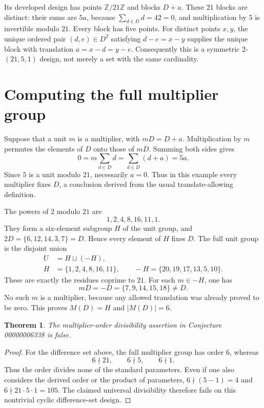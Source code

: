 \documentclass[11pt]{article}
\newtheorem{theorem}{Theorem}
\newcommand{\Z}{\mathbb Z}
\begin{document}
Its developed design has points $\Z/21\Z$ and blocks $D+a$.
These $21$ blocks are distinct: their sums are $5a$, because
$\sum_{d\in D}d=42=0$, and multiplication by $5$ is invertible modulo $21$.
Every block has five points. For distinct points $x,y$, the unique
ordered pair $(d,e)\in D^2$ satisfying $d-e=x-y$ supplies the unique
block with translation $a=x-d=y-e$. Consequently this is a symmetric
$2$-$(21,5,1)$ design, not merely a set with the same cardinality.

\section*{Computing the full multiplier group}
Suppose that a unit $m$ is a multiplier, with $mD=D+a$.
Multiplication by $m$ permutes the elements of $D$ onto those of $mD$.
Summing both sides gives
\[
       0=m\sum_{d\in D}d=\sum_{d\in D}(d+a)=5a.
\]
Since $5$ is a unit modulo $21$, necessarily $a=0$.
Thus in this example every multiplier fixes $D$, a conclusion derived
from the usual translate-allowing definition.

The powers of $2$ modulo $21$ are
\[
       1,2,4,8,16,11,1.
\]
They form a six-element subgroup $H$ of the unit group, and
$2D=\{6,12,14,3,7\}=D$. Hence every element of $H$ fixes $D$.
The full unit group is the disjoint union
\[
\begin{split}
 U&=H\sqcup(-H),\\
 H&=\{1,2,4,8,16,11\},\qquad
 -H=\{20,19,17,13,5,10\}.
\end{split}
\]
These are exactly the residues coprime to $21$.
For each $m\in-H$, one has
\[
       mD=-D=\{7,9,14,15,18\}\ne D.
\]
No such $m$ is a multiplier, because any allowed translation was
already proved to be zero. This proves $M(D)=H$ and $|M(D)|=6$.

\begin{theorem}
The multiplier-order divisibility assertion in Conjecture 00000006338
is false.
\end{theorem}
\begin{proof}
For the difference set above, the full multiplier group has order $6$,
whereas
\[
       6\nmid21,\qquad 6\nmid5,\qquad 6\nmid1.
\]
Thus the order divides none of the standard parameters. Even if one
also considers the derived order or the product of parameters,
$6\nmid(5-1)=4$ and $6\nmid21\cdot5\cdot1=105$.
The claimed universal divisibility therefore fails on this nontrivial
cyclic difference-set design.
\end{proof}
\end{document}
